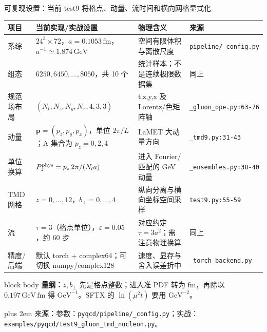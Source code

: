 \documentclass[UTF8,aspectratio=169,11pt]{ctexbeamer}
\renewcommand{\arraystretch}{0.92}
\newcommand{\source}[1]{%
  \par\vspace{0.02em}\begingroup\fontsize{6}{6.8}\selectfont\raggedright\sloppy
  \setlength{\emergencystretch}{3em}\rightskip=0pt plus 2em
  \color{muted}来源：#1\par\endgroup}
\begin{document}
\begin{frame}[t]{可复现设置：当前 test9 将格点、动量、流时间和横向网格显式化}
  \footnotesize
  \renewcommand{\arraystretch}{0.64}
  \begin{tabularx}{0.98\textwidth}{@{}p{}Yp{0.22\textwidth}Y@{}}
    \toprule
    项目 & 当前实现/实战设置 & 物理含义 & 来源\\
    \midrule
    系综 & \(24^3\times72\)，\(a=0.1053\,\mathrm{fm}\)，\(a^{-1}\simeq1.874\,\mathrm{GeV}\) & 空间有限体积与离散尺度 & \nolinkurl{pipeline/_config.py}\\
    组态 & \(6250,6450,\ldots,8050\)，共 10 个 & 统计样本；不是连续极限数据集 & 同上\\
    规范场布局 & \((N_t,N_z,N_y,N_x,4,3,3)\) & t,z,y,x 及 Lorentz/色矩阵轴 & \nolinkurl{_gluon_ope.py:63-76}\\
    动量 & \(\boldsymbol p=(p_z,p_y,p_x)\)，单位 \(2\pi/L\)；A 集合为 \(p_z=0,2,4\) & LaMET 大动量方向 & \nolinkurl{_tmd9.py:31-43}\\
    单位换算 & \(P_z^{\rm phys}=p_z\,2\pi/(N_l a)\) & 进入 Fourier/匹配的 GeV 动量 & \nolinkurl{_ensembles.py:38-40}\\
    TMD 网格 & \(z=0,\ldots,12\)，\(b_\perp=0,\ldots,4\) & 纵向分离与横向坐标空间采样 & \nolinkurl{test9.py:55-59}\\
    流 & \(\tau=3\)（格点单位），\(\varepsilon=0.05\)，约 60 步 & 对应约定 \(\tau=3a^2\)；需注意物理换算 & 同上\\
    精度/后端 & 默认 torch + complex64；可切换 numpy/complex128 & 速度、显存与舍入误差折中 & \nolinkurl{_torch_backend.py}\\
    \bottomrule
  \end{tabularx}
  \vspace{0.08em}
  \begin{beamercolorbox}[wd=0.98\textwidth,sep=0.05em,rounded=true]{block body}
    \scriptsize\textbf{量纲：}\(z,b_\perp\) 先是格点整数；进入准 PDF 转为 fm，再除以
    \(0.197\,\mathrm{GeV\,fm}\) 得 \(\mathrm{GeV}^{-1}\)。SFTX 的 \(\ln(\mu^2t)\) 要用 \(\mathrm{GeV}^{-2}\)。
  \end{beamercolorbox}
  \vspace{-0.12em}
  \vspace{-0.20em}
  \source{参数：\nolinkurl{pyqcd/pipeline/_config.py}；实战：\nolinkurl{examples/pyqcd/test9_gluon_tmd_nucleon.py}。}
\end{frame}
\end{document}
